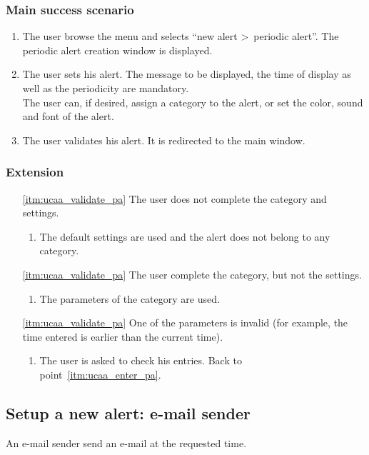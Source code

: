 \subsubsection{Main success scenario}
\begin{enumerate}
	\item The user browse the menu and selects ``new alert \textgreater~periodic alert''. The periodic alert creation window is displayed. 
	\item\label{itm:ucaa_enter_pa} The user sets his alert. The message to be displayed, the time of display as well as the periodicity are mandatory. \\The user can, if desired, assign a category to the alert, or set the color, sound and font of the alert.
	\item\label{itm:ucaa_validate_pa} The user validates his alert. It is redirected to the main window.
\end{enumerate}
\subsubsection{Extension}
\begin{enumerate}
	\item[\ref{itm:ucaa_validate_pa}] The user does not complete the category and settings.
	\begin{enumerate}[i]
		\item The default settings are used and the alert does not belong to any category.
	\end{enumerate}
	\item[\ref{itm:ucaa_validate_pa}] The user complete the category, but not the settings.
	\begin{enumerate}[i]
		\item The parameters of the category are used.
	\end{enumerate}
	\item[\ref{itm:ucaa_validate_pa}] One of the parameters is invalid (for example, the time entered is earlier than the current time).
	\begin{enumerate}[i]
		\item The user is asked to check his entries. Back to point~\ref{itm:ucaa_enter_pa}.
	\end{enumerate}
\end{enumerate}

\subsection{Setup a new alert: e-mail sender}
An e-mail sender send an e-mail at the requested time.
